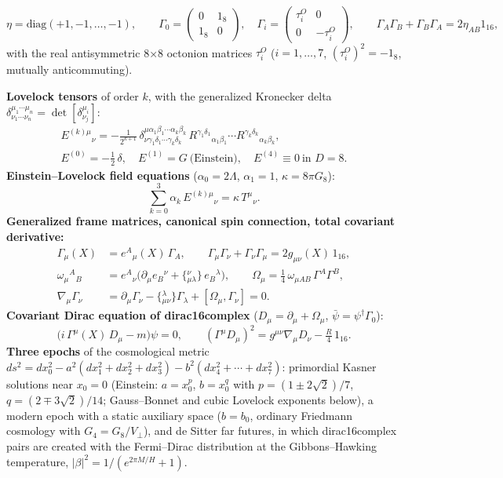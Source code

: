\documentclass[10pt,a4paper]{article}
\begin{document}
\begin{equation*}
\eta=\mathrm{diag}(+1,-1,\dots,-1),\qquad \Gamma_0=\begin{pmatrix}0&1_8\\1_8&0\end{pmatrix},\quad \Gamma_i=\begin{pmatrix}\tau^{O}_i&0\\0&-\tau^{O}_i\end{pmatrix},\qquad \Gamma_A\Gamma_B+\Gamma_B\Gamma_A=2\eta_{AB}1_{16},
\end{equation*}
with the real antisymmetric 8×8 octonion matrices $\tau^{O}_i$ ($i=1,\dots,7$, $(\tau^O_i)^2=-1_8$, mutually anticommuting).

\textbf{Lovelock tensors} of order $k$, with the generalized Kronecker delta $\delta^{\mu_1\cdots\mu_n}_{\nu_1\cdots\nu_n}=\det[\delta^{\mu_i}_{\nu_j}]$:
\begin{gather*}
E^{(k)\mu}{}_{\nu}=-\frac{1}{2^{k+1}}\,\delta^{\mu\alpha_1\beta_1\cdots\alpha_k\beta_k}_{\nu\gamma_1\delta_1\cdots\gamma_k\delta_k}\,R^{\gamma_1\delta_1}{}_{\alpha_1\beta_1}\cdots R^{\gamma_k\delta_k}{}_{\alpha_k\beta_k},\\ E^{(0)}=-\tfrac12\,\delta,\quad E^{(1)}=G\ \text{(Einstein)},\quad E^{(4)}\equiv0\ \text{in }D=8.
\end{gather*}
\textbf{Einstein–Lovelock field equations} ($\alpha_0=2\Lambda$, $\alpha_1=1$, $\kappa=8\pi G_8$):
\begin{equation*}
\sum_{k=0}^{3}\alpha_k\,E^{(k)\mu}{}_{\nu}=\kappa\,T^{\mu}{}_{\nu}.
\end{equation*}
\textbf{Generalized frame matrices, canonical spin connection, total covariant derivative:}
\begin{align*}
\Gamma_\mu(X)&=e^A{}_\mu(X)\,\Gamma_A,\qquad \Gamma_\mu\Gamma_\nu+\Gamma_\nu\Gamma_\mu=2g_{\mu\nu}(X)\,1_{16}, \\
\omega_\mu{}^A{}_B&=e^A{}_\nu\big(\partial_\mu e_B{}^\nu+\{{}^{\nu}_{\mu\lambda}\}\,e_B{}^\lambda\big),\qquad \Omega_\mu=\tfrac14\,\omega_{\mu AB}\,\Gamma^A\Gamma^B, \\
\nabla_\mu\Gamma_\nu&=\partial_\mu\Gamma_\nu-\{{}^{\lambda}_{\mu\nu}\}\Gamma_\lambda+[\Omega_\mu,\Gamma_\nu]=0 .
\end{align*}
\textbf{Covariant Dirac equation of dirac16complex} ($D_\mu=\partial_\mu+\Omega_\mu$, $\bar\psi=\psi^\dagger\Gamma_0$):
\begin{equation*}
\big(i\,\Gamma^\mu(X)\,D_\mu-m\big)\psi=0,\qquad (\Gamma^\mu D_\mu)^2=g^{\mu\nu}\nabla_\mu D_\nu-\tfrac{R}{4}\,1_{16}.
\end{equation*}
\textbf{Three epochs} of the cosmological metric $ds^2=dx_0^2-a^2(dx_1^2+dx_2^2+dx_3^2)-b^2(dx_4^2+\cdots+dx_7^2)$: primordial Kasner solutions near $x_0=0$ (Einstein: $a=x_0^{p}$, $b=x_0^{q}$ with $p=(1\pm2\sqrt2)/7$, $q=(2\mp3\sqrt2)/14$; Gauss–Bonnet and cubic Lovelock exponents below), a modern epoch with a static auxiliary space ($b=b_0$, ordinary Friedmann cosmology with $G_4=G_8/V_\perp$), and de Sitter far futures, in which dirac16complex pairs are created with the Fermi–Dirac distribution at the Gibbons–Hawking temperature, $|\beta|^2=1/(e^{2\pi M/H}+1)$.
\end{document}
